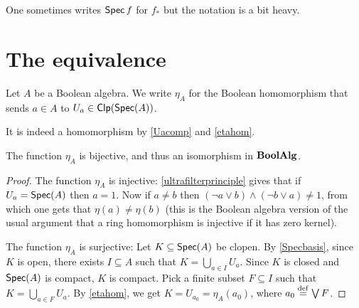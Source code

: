 \documentclass[a4paper,10pt]{article}
\numberwithin{theorem}{section}
\begin{document}
One sometimes writes $\operatorname*{\mathsf{Spec}} f$ for $f_*$ but
the notation is a bit heavy.

\section{The equivalence}
\begin{definition}
Let $A$ be a Boolean algebra. We write $\eta_A$ for the Boolean homomorphism
that sends $a \in A$ to $U_a \in \operatorname*{\mathsf{Clp}}(\operatorname*{\mathsf{Spec}}(A))$.
\end{definition}
It is indeed a homomorphism by \cref{Uacomp} and \cref{etahom}.
\begin{proposition}
The function $\eta_A$ is bijective, and thus an isomorphism in $\mathbf{BoolAlg}$.
\end{proposition}
\begin{proof}
    The function $\eta_A$ is injective: 
    \cref{ultrafilterprinciple} gives that if $U_a = \operatorname*{\mathsf{Spec}}(A)$ then 
    $a = 1$. Now if $a \neq b$ then $(\neg a \vee b) \wedge (\neg b \vee a)
    \neq 1$, from which one gets that $\eta(a) \neq \eta(b)$ (this is the
    Boolean algebra version of the usual argument that a ring homomorphism is
    injective if it has zero kernel). 

    The function $\eta_A$ is surjective: Let $K \subseteq \operatorname*{\mathsf{Spec}}(A)$ be clopen.
    By \cref{Specbasis}, since $K$ is open, there exists $I \subseteq A$ such
    that $K = \bigcup_{a \in I} U_a$. Since $K$ is closed and $\operatorname*{\mathsf{Spec}}(A)$ is
    compact, $K$ is compact. Pick a finite subset $F \subseteq I$ such that $K
    = \bigcup_{a \in F} U_a$. By \cref{etahom}, we get $K = U_{a_0} =
    \eta_A(a_0)$, where $a_0 \stackrel{\mathrm{def}}{=} \bigvee F$.
\end{proof}
\end{document}
